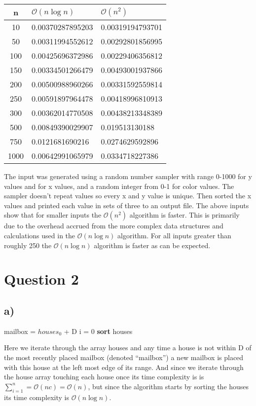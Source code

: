 \documentclass[12pt]{article}
\begin{document}
\begin{tabular}{|c|l|l|}
    \hline
    \textbf{n} & \textbf{$\mathcal{O}(n\log{}n)$} & {$\mathcal{O}(n^2)$}\\
    \hline
    10 & 0.00370287895203 & 0.00319194793701 \\
    \hline
    50 & 0.00311994552612 & 0.00292801856995 \\
    \hline
    100 & 0.00425696372986 & 0.00229406356812 \\
    \hline
    150 & 0.00334501266479 & 0.00493001937866 \\
    \hline
    200 & 0.00500988960266 & 0.00331592559814 \\
    \hline
    250 & 0.00591897964478 & 0.00418996810913 \\
    \hline
    300 & 0.00362014770508 & 0.00438213348389 \\
    \hline
    500 & 0.00849390029907 & 0.019513130188 \\
    \hline
    750 & 0.0121681690216 & 0.0274629592896 \\
    \hline
    1000 & 0.00642991065979 & 0.0334718227386 \\
    \hline
\end{tabular}

The input was generated using a random number sampler with range 0-1000 for y values and for x values, and a random integer from 0-1 for color values. The sampler doesn't repeat values so every x and y value is unique. Then sorted the x values and printed each value in sets of three to an output file. The above inputs show that for smaller inputs the $\mathcal{O}(n^2)$ algorithm is faster. This is primarily due to the overhead accrued from the more complex data structures and calculations used in the $\mathcal{O}(n\log{}n)$ algorithm. For all inputs greater than roughly 250 the $\mathcal{O}(n\log{}n)$ algorithm is faster as can be expected.

\section*{Question 2}
\subsection*{a)}
\begin{center}
\begin{algorithm}
    mailbox = $houses_0$ + D\;
    i = 0\;
    \textbf{sort} houses\;
\end{algorithm}
\end{center}
Here we iterate through the array houses and any time a house is not within D of the most recently placed mailbox (denoted ``mailbox'') a new mailbox is placed with this house at the left most edge of its range. And since we iterate through the house array touching each house once its time complexity is is $\sum_{i=1}^n = \mathcal{O}(nc) = \mathcal{O}(n)$, but since the algorithm starts by sorting the houses its time complexity is $\mathcal{O}(n\log n)$.
\end{document}
